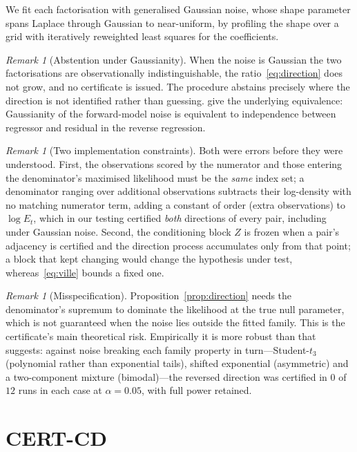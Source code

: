\documentclass[11pt,a4paper]{article}
\theoremstyle{definition}
\theoremstyle{remark}
\newtheorem{remark}[theorem]{Remark}
\begin{document}
We fit each factorisation with generalised Gaussian noise, whose shape parameter
spans Laplace through Gaussian to near-uniform, by profiling the shape over a
grid with iteratively reweighted least squares for the coefficients.

\begin{remark}[Abstention under Gaussianity]
When the noise is Gaussian the two factorisations are observationally
indistinguishable, the ratio~\eqref{eq:direction} does not grow, and no
certificate is issued. The procedure abstains precisely where the direction is
not identified rather than guessing. \citet{ding2025gaussdetect} give the
underlying equivalence: Gaussianity of the forward-model noise is equivalent to
independence between regressor and residual in the reverse regression.
\end{remark}

\begin{remark}[Two implementation constraints]
\label{rem:constraints}
Both were errors before they were understood. First, the observations scored by
the numerator and those entering the denominator's maximised likelihood must be
the \emph{same} index set; a denominator ranging over additional observations
subtracts their log-density with no matching numerator term, adding a constant
of order (extra observations) to $\log E_t$, which in our testing certified
\emph{both} directions of every pair, including under Gaussian noise. Second,
the conditioning block $Z$ is frozen when a pair's adjacency is certified and
the direction process accumulates only from that point; a block that kept
changing would change the hypothesis under test, whereas~\eqref{eq:ville} bounds
a fixed one.
\end{remark}

\begin{remark}[Misspecification]
\label{rem:misspec}
Proposition~\ref{prop:direction} needs the denominator's supremum to dominate
the likelihood at the true null parameter, which is not guaranteed when the
noise lies outside the fitted family. This is the certificate's main theoretical
risk. Empirically it is more robust than that suggests: against noise breaking
each family property in turn---Student-$t_3$ (polynomial rather than exponential
tails), shifted exponential (asymmetric) and a two-component mixture
(bimodal)---the reversed direction was certified in $0$ of $12$ runs in each
case at $\alpha = 0.05$, with full power retained.
\end{remark}

\section{CERT-CD}
\label{sec:algorithm}
\end{document}
